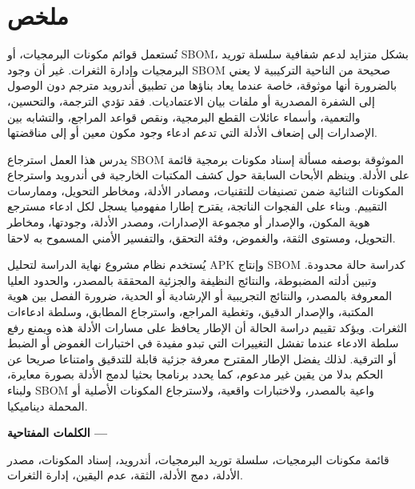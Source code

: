 \chapter*{\textarabic{ملخص}}

\begin{otherlanguage}{arabic}
تُستعمل قوائم مكونات البرمجيات، أو \textenglish{SBOM}، بشكل متزايد لدعم
شفافية سلسلة توريد البرمجيات وإدارة الثغرات. غير أن وجود \textenglish{SBOM}
صحيحة من الناحية التركيبية لا يعني بالضرورة أنها موثوقة، خاصة عندما يعاد
بناؤها من تطبيق أندرويد مترجم دون الوصول إلى الشفرة المصدرية أو ملفات بيان
الاعتماديات. فقد تؤدي الترجمة، والتحسين، والتعمية، وأسماء عائلات القطع
البرمجية، ونقص قواعد المراجع، والتشابه بين الإصدارات إلى إضعاف الأدلة التي
تدعم ادعاء وجود مكون معين أو إلى مناقضتها.

يدرس هذا العمل استرجاع \textenglish{SBOM} الموثوقة بوصفه مسألة إسناد
مكونات برمجية قائمة على الأدلة. وينظم الأبحاث السابقة حول كشف المكتبات
الخارجية في أندرويد واسترجاع المكونات الثنائية ضمن تصنيفات للتقنيات، ومصادر
الأدلة، ومخاطر التحويل، وممارسات التقييم. وبناء على الفجوات الناتجة، يقترح
إطارا مفهوميا يسجل لكل ادعاء مسترجع هوية المكون، والإصدار أو مجموعة
الإصدارات، ومصدر الأدلة، وجودتها، ومخاطر التحويل، ومستوى الثقة، والغموض،
وفئة التحقق، والتفسير الأمني المسموح به لاحقا.

يُستخدم نظام مشروع نهاية الدراسة لتحليل \textenglish{APK} وإنتاج
\textenglish{SBOM} كدراسة حالة محدودة. وتبين أدلته المضبوطة، والنتائج
النظيفة والجزئية المحققة بالمصدر، والحدود العليا المعروفة بالمصدر، والنتائج
التجريبية أو الإرشادية أو الحدية، ضرورة الفصل بين هوية المكتبة، والإصدار
الدقيق، وتغطية المراجع، واسترجاع المطابق، وسلطة ادعاءات الثغرات. ويؤكد تقييم
دراسة الحالة أن الإطار يحافظ على مسارات الأدلة هذه ويمنع رفع سلطة الادعاء
عندما تفشل التغييرات التي تبدو مفيدة في اختبارات الغموض أو الضبط أو الترقية.
لذلك يفضل
الإطار المقترح معرفة جزئية قابلة للتدقيق وامتناعا صريحا عن الحكم بدلا من
يقين غير مدعوم، كما يحدد برنامجا بحثيا لدمج الأدلة بصورة معايرة، ولبناء
\textenglish{SBOM} واعية بالمصدر، ولاختبارات واقعية، ولاسترجاع المكونات
الأصلية أو المحملة ديناميكيا.
\end{otherlanguage}

\vspace{0.5cm}
\noindent\textbf{\textarabic{الكلمات المفتاحية} ---}
\begin{otherlanguage}{arabic}
قائمة مكونات البرمجيات، سلسلة توريد البرمجيات، أندرويد، إسناد المكونات،
مصدر الأدلة، دمج الأدلة، الثقة، عدم اليقين، إدارة الثغرات.
\end{otherlanguage}
